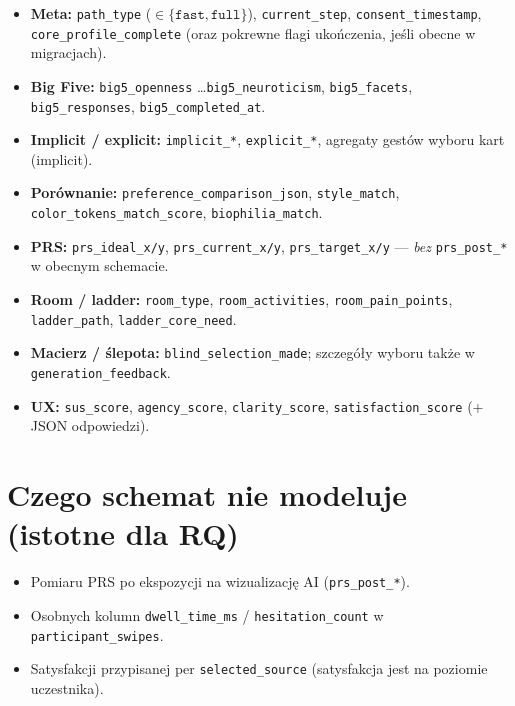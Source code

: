 \begin{itemize}
  \sloppy
  \item \textbf{Meta:} \texttt{path\_type} ($\in\{\texttt{fast},\texttt{full}\}$), \texttt{current\_step}, \texttt{consent\_timestamp}, \texttt{core\_profile\_complete} (oraz pokrewne flagi ukończenia, jeśli obecne w migracjach).
  \item \textbf{Big Five:} \texttt{big5\_openness} \ldots \texttt{big5\_neuroticism}, \texttt{big5\_facets}, \texttt{big5\_responses}, \texttt{big5\_completed\_at}.
  \item \textbf{Implicit / explicit:} \texttt{implicit\_*}, \texttt{explicit\_*}, agregaty gestów wyboru kart (implicit).
  \item \textbf{Porównanie:} \texttt{preference\_comparison\_json}, \texttt{style\_match}, \texttt{color\_tokens\_match\_score}, \texttt{biophilia\_match}.
  \item \textbf{PRS:} \texttt{prs\_ideal\_x/y}, \texttt{prs\_current\_x/y}, \texttt{prs\_target\_x/y} --- \emph{bez} \texttt{prs\_post\_*} w obecnym schemacie.
  \item \textbf{Room / ladder:} \texttt{room\_type}, \texttt{room\_activities}, \texttt{room\_pain\_points}, \texttt{ladder\_path}, \texttt{ladder\_core\_need}.
  \item \textbf{Macierz / ślepota:} \texttt{blind\_selection\_made}; szczegóły wyboru także w \texttt{generation\_feedback}.
  \item \textbf{UX:} \texttt{sus\_score}, \texttt{agency\_score}, \texttt{clarity\_score}, \texttt{satisfaction\_score} (+ JSON odpowiedzi).
\end{itemize}

\section{Czego schemat nie modeluje (istotne dla RQ)}
\label{app:a:sec:luki}

\begin{itemize}
  \sloppy
  \item Pomiaru PRS po ekspozycji na wizualizację AI (\texttt{prs\_post\_*}).
  \item Osobnych kolumn \texttt{dwell\_time\_ms} / \texttt{hesitation\_count} w \texttt{participant\_swipes}.
  \item Satysfakcji przypisanej per \texttt{selected\_source} (satysfakcja jest na poziomie uczestnika).
\end{itemize}

